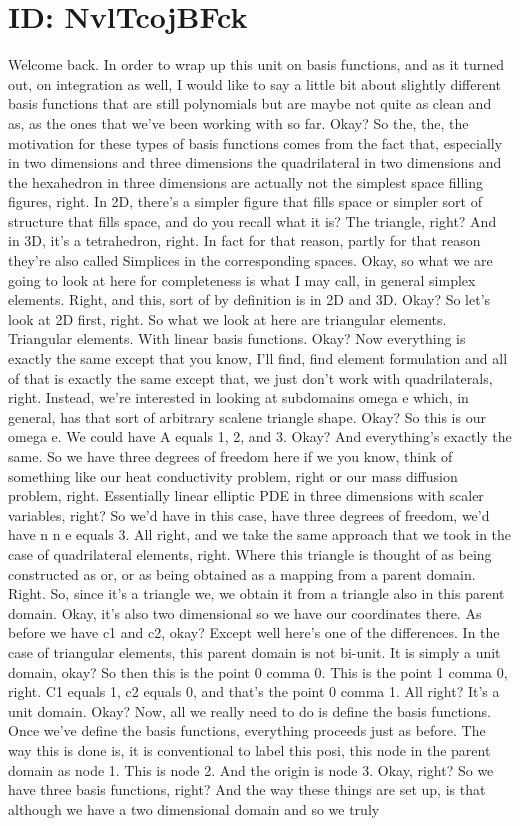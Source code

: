\documentclass[10pt]{article}
\begin{document}
\section*{ID: NvlTcojBFck}
Welcome back. In order to wrap up this unit on basis functions, and as it turned out, on integration as well, I would like to say a little bit about slightly different basis functions that are still polynomials but are maybe not quite as clean and as, as the ones that we've been working with so far. Okay? So the, the, the motivation for these types of basis functions comes from the fact that, especially in two dimensions and three dimensions the quadrilateral in two dimensions and the hexahedron in three dimensions are actually not the simplest space filling figures, right. In 2D, there's a simpler figure that fills space or simpler sort of structure that fills space, and do you recall what it is? The triangle, right? And in 3D, it's a tetrahedron, right. In fact for that reason, partly for that reason they're also called Simplices in the corresponding spaces. Okay, so what we are going to look at here for completeness is what I may call, in general simplex elements. Right, and this, sort of by definition is in 2D and 3D. Okay? So let's look at 2D first, right. So what we look at here are triangular elements. Triangular elements. With linear basis functions. Okay? Now everything is exactly the same except that you know, I'll find, find element formulation and all of that is exactly the same except that, we just don't work with quadrilaterals, right. Instead, we're interested in looking at subdomains omega e which, in general, has that sort of arbitrary scalene triangle shape. Okay? So this is our omega e. We could have A equals 1, 2, and 3. Okay? And everything's exactly the same. So we have three degrees of freedom here if we you know, think of something like our heat conductivity problem, right or our mass diffusion problem, right. Essentially linear elliptic PDE in three dimensions with scaler variables, right? So we'd have in this case, have three degrees of freedom, we'd have n n e equals 3. All right, and we take the same approach that we took in the case of quadrilateral elements, right. Where this triangle is thought of as being constructed as or, or as being obtained as a mapping from a parent domain. Right. So, since it's a triangle we, we obtain it from a triangle also in this parent domain. Okay, it's also two dimensional so we have our coordinates there. As before we have c1 and c2, okay? Except well here's one of the differences. In the case of triangular elements, this parent domain is not bi-unit. It is simply a unit domain, okay? So then this is the point 0 comma 0. This is the point 1 comma 0, right. C1 equals 1, c2 equals 0, and that's the point 0 comma 1. All right? It's a unit domain. Okay? Now, all we really need to do is define the basis functions. Once we've define the basis functions, everything proceeds just as before. The way this is done is, it is conventional to label this posi, this node in the parent domain as node 1. This is node 2. And the origin is node 3. Okay, right? So we have three basis functions, right? And the way these things are set up, is that although we have a two dimensional domain and so we truly 
\end{document}
